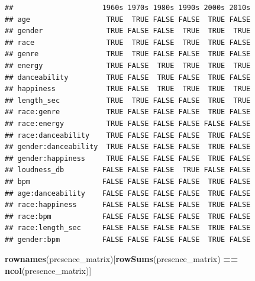 \documentclass[
]{article}
\newenvironment{Shaded}{\begin{snugshade}}{\end{snugshade}}
\newcommand{\ControlFlowTok}[1]{\textcolor[rgb]{0.13,0.29,0.53}{\textbf{#1}}}
\newcommand{\FunctionTok}[1]{\textcolor[rgb]{0.13,0.29,0.53}{\textbf{#1}}}
\newcommand{\NormalTok}[1]{#1}
\newcommand{\OtherTok}[1]{\textcolor[rgb]{0.56,0.35,0.01}{#1}}
\newcommand{\SpecialCharTok}[1]{\textcolor[rgb]{0.81,0.36,0.00}{\textbf{#1}}}
\newcommand{\StringTok}[1]{\textcolor[rgb]{0.31,0.60,0.02}{#1}}
\begin{document}
\begin{Shaded}
\end{Shaded}

\begin{verbatim}
##                     1960s 1970s 1980s 1990s 2000s 2010s
## age                  TRUE  TRUE FALSE FALSE  TRUE FALSE
## gender               TRUE FALSE FALSE  TRUE  TRUE  TRUE
## race                 TRUE  TRUE FALSE  TRUE  TRUE FALSE
## genre                TRUE  TRUE FALSE FALSE  TRUE FALSE
## energy               TRUE FALSE  TRUE  TRUE  TRUE  TRUE
## danceability         TRUE FALSE  TRUE FALSE  TRUE FALSE
## happiness            TRUE FALSE  TRUE  TRUE  TRUE  TRUE
## length_sec           TRUE  TRUE FALSE FALSE  TRUE  TRUE
## race:genre           TRUE FALSE FALSE FALSE  TRUE FALSE
## race:energy          TRUE FALSE FALSE FALSE FALSE FALSE
## race:danceability    TRUE FALSE FALSE FALSE  TRUE FALSE
## gender:danceability  TRUE FALSE FALSE FALSE  TRUE FALSE
## gender:happiness     TRUE FALSE FALSE FALSE  TRUE FALSE
## loudness_db         FALSE FALSE FALSE  TRUE FALSE FALSE
## bpm                 FALSE FALSE FALSE FALSE  TRUE FALSE
## age:danceability    FALSE FALSE FALSE FALSE  TRUE FALSE
## race:happiness      FALSE FALSE FALSE FALSE  TRUE FALSE
## race:bpm            FALSE FALSE FALSE FALSE  TRUE FALSE
## race:length_sec     FALSE FALSE FALSE FALSE  TRUE FALSE
## gender:bpm          FALSE FALSE FALSE FALSE  TRUE FALSE
\end{verbatim}

\begin{Shaded}
\begin{Highlighting}[]
\FunctionTok{rownames}\NormalTok{(presence\_matrix)[}\FunctionTok{rowSums}\NormalTok{(presence\_matrix) }\SpecialCharTok{==} \FunctionTok{ncol}\NormalTok{(presence\_matrix)]}
\end{Highlighting}
\end{Shaded}
\end{document}
